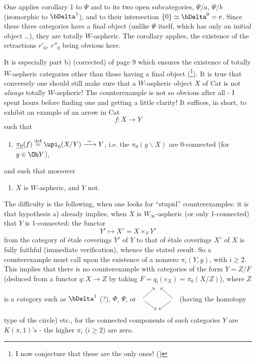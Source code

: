 One applies corollary 1 to $\Psi$ and to its two open subcategories, $\Psi/a$, $\Psi/b$ (isomorphic to $\bDelta^1$), and to their intersection $\{0\} \simeq \bDelta^0 = e$. Since these three categories have a final object (unlike $\Psi$ itself, which has only an initial object \dots), they are totally $W$-aspheric. The corollary applies, the existence of the retractions $r'_0$, $r''_0$ being obvious here.

It is especially part b) (corrected) of page 9 which ensures the existence of totally $W$-aspheric categories other than those having a final object (\footnote{I now conjecture that these are the only ones! (\footnotemark)}). It is true that conversely one should still make sure that a $W$-aspheric object $X$ of Cat is not \textit{always} totally $W$-aspheric! The counterexample is not so obvious after all -
I spent hours before finding one and getting a little clarity! It suffices, in short, to exhibit an example of an arrow in Cat
\[
f : X \longrightarrow Y
\]
such that
\begin{enumerate}[label=\alph*)]
\item $\underline{\pi_0}(f) \overset{\text{def}}{=} \upi_0(X/Y) \xrightarrow{\ \sim\ } Y$, i.e. the $\pi_0(y\backslash X)$ are 0-connected (for $y \in \Ob Y$),
\end{enumerate}

and such that moreover

\begin{enumerate}[label=\alph*), start=2]
\item $X$ is $W$-aspheric, and $Y$ not.
\end{enumerate}

The difficulty is the following, when one looks for ``stupid'' counterexamples: it is that hypothesis a) already implies, when $X$ is $W_\infty$-aspheric (or only 1-connected) that $Y$ is 1-connected: the functor
\[
Y' \longmapsto X' = X \times_Y Y'
\]
from the category of étale coverings $Y'$ of $Y$ to that of étale coverings $X'$ of $X$ is fully faithful (immediate verification), whence the stated result. So a counterexample must call upon the existence of a nonzero $\pi_i(Y,y)$, with $i \geq 2$. This implies
that there is no counterexample with categories of the form $Y = Z/F$ (deduced from a functor $q : X \longrightarrow Z$ by taking $F = q_!(e_X) = \pi_0(X/Z)$), where $Z$ is a category such as $\bDelta^1$ (?), $\Phi$, $\Psi$, or $\begin{tikzcd}[ampersand replacement=\&, sep=small, baseline=(M.base)]
 \& {} \& \\
{} \arrow[ur] \arrow[dr] \& |[alias=M]| \phantom{x} \& {} \arrow[ul] \arrow[dl] \\
 \& {} \&
\end{tikzcd}$ (having the homotopy type of the circle) etc., for the connected components of such categories $Y$ are $K(\pi,1)$'s - the higher $\pi_i$ ($i \geq 2$) are zero.

